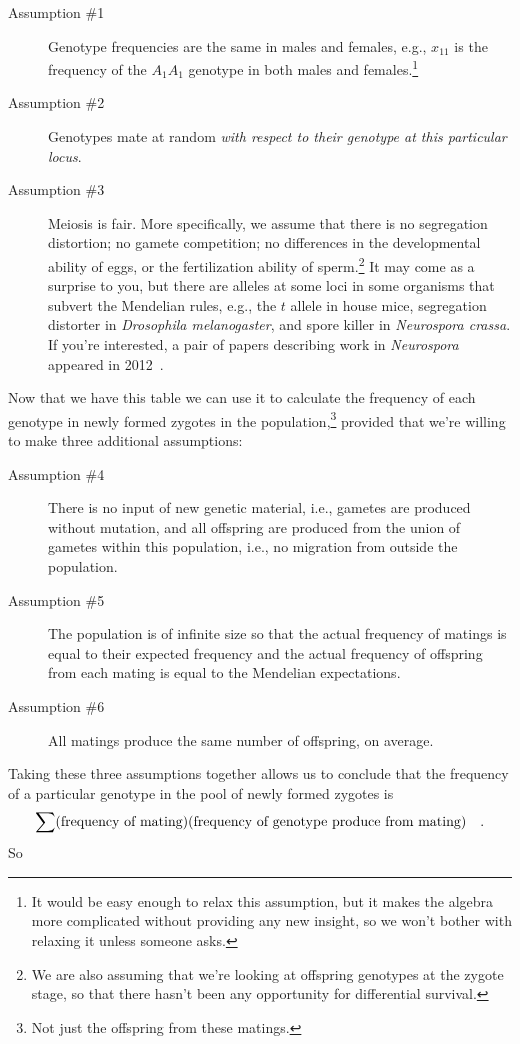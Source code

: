 \begin{description}

\item[Assumption \#1] Genotype frequencies are the same in males and
  females, e.g., $x_{11}$ is the frequency of the $A_1A_1$ genotype in
  both males and females.\footnote{It would be easy enough to relax
    this assumption, but it makes the algebra more complicated without
    providing any new insight, so we won't bother with relaxing it
    unless someone asks.}

\item[Assumption \#2] Genotypes mate at random {\it with respect to
  their genotype at this particular locus}.

\item[Assumption \#3] Meiosis is fair. More specifically, we assume
  that there is no segregation distortion; no gamete competition; no
  differences in the developmental ability of eggs, or the
  fertilization ability of sperm.\footnote{We are also assuming that
    we're looking at offspring genotypes at the zygote stage, so that
    there hasn't been any opportunity for differential survival.} It
  may come as a surprise to you, but there are alleles at some loci in
  some organisms that subvert the Mendelian rules, e.g., the $t$
  allele in house mice, segregation distorter in {\it Drosophila
    melanogaster}, and spore killer in {\it Neurospora crassa\/}. If
  you're interested, a pair of papers describing work in {\it
    Neurospora\/} appeared in 2012~\cite{Hammond-etal-2012,Saupe-2012}.

\end{description}
Now that we have this table we can use it to calculate the frequency
of each genotype in newly formed zygotes in the
population,\footnote{Not just the offspring from these matings.}
provided that we're willing to make three additional assumptions:

\begin{description}

\item[Assumption \#4] There is no input of new genetic material, i.e.,
gametes are produced without mutation, and all offspring are produced
from the union of gametes within this population, i.e., no migration
from outside the population.

\item[Assumption \#5] The population is of infinite size so that the
actual frequency of matings is equal to their expected frequency and
the actual frequency of offspring from each mating is equal to the
Mendelian expectations.

\item[Assumption \#6] All matings produce the same number of
offspring, on average.

\end{description}
Taking these three assumptions together allows us to conclude that the
frequency of a particular genotype in the pool of newly formed zygotes
is
\[
\sum(\hbox{frequency of mating})(\hbox{frequency of genotype produce
  from mating}) \quad .
\]
So

